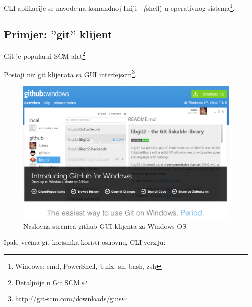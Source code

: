\documentclass[times, utf8, seminar]{fit}
\begin{document}
CLI aplikacije se navode na komandnoj liniji - \emph(shell)-u operativnog sistema\footnote{Windows: cmd, PowerShell, Unix: sh, bash, zsh}.

\subsection{Primjer: ''git'' klijent}
\label{sec:git}

Git je popularni SCM alat\footnote{Detaljnije u Git SCM \citep{agilegit}}

Postoji niz git klijenata sa GUI interfejsom\footnote{http://git-scm.com/downloads/guis}. 

\begin{figure}[H]
\centering
\includegraphics[width=12cm]{img/github_windows.png}
\caption{Naslovna stranica github GUI klijenta za Windows OS}
\end{figure}


Ipak, većina git korisnika koristi osnovnu, CLI verziju:
\end{document}
